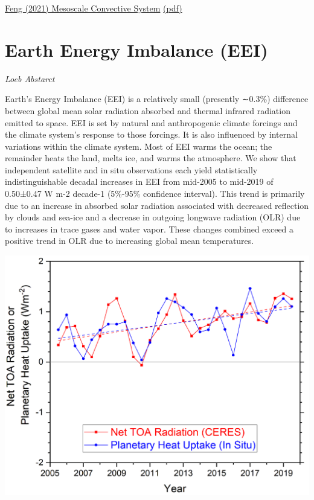 \documentclass[
]{book}
\begin{document}
\href{https://agupubs.onlinelibrary.wiley.com/doi/10.1029/2020JD034202}{Feng (2021) Mesoscale Convective System}
\href{pdf/Feng_2021_Mesoscale_Convective_System.pdf}{(pdf)}

\hypertarget{earth-energy-imbalance-eei}{%
\section{Earth Energy Imbalance (EEI)}\label{earth-energy-imbalance-eei}}

\emph{Loeb Abstarct}

Earth's Energy Imbalance (EEI) is a relatively small (presently ∼0.3\%) difference between global mean solar radiation absorbed and thermal infrared radiation emitted to space. EEI is set by natural and anthropogenic climate forcings and the climate system's response to those forcings. It is also influenced by internal variations within the climate system. Most of EEI warms the ocean; the remainder heats the land, melts ice, and warms the atmosphere. We show that independent satellite and in situ observations each yield statistically indistinguishable decadal increases in EEI from mid-2005 to mid-2019 of 0.50±0.47 W m-2 decade-1 (5\%-95\% confidence interval). This trend is primarily due to an increase in absorbed solar radiation associated with decreased reflection by clouds and sea-ice and a decrease in outgoing longwave radiation (OLR) due to increases in trace gases and water vapor. These changes combined exceed a positive trend in OLR due to increasing global mean temperatures.

\includegraphics{fig/earth_energy_imbalance.png}
\end{document}
